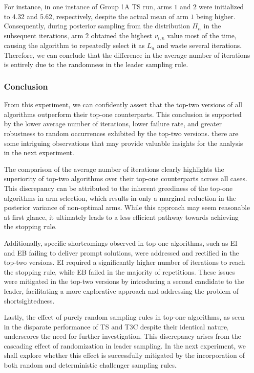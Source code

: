\documentclass[a4paper, 12pt]{article}
\theoremstyle{definition}
\begin{document}
For instance, in one instance of Group 1A TS run, arms $1$ and $2$ were initialized to 4.32 and 5.62, respectively, despite the actual mean of arm $1$ being higher. Consequently, during posterior sampling from the distribution $\Pi_n$ in the subsequent iterations, arm $2$ obtained the highest $v_{i,n}$ value most of the time, causing the algorithm to repeatedly select it as $L_n$ and waste several iterations. Therefore, we can conclude that the difference in the average number of iterations is entirely due to the randomness in the leader sampling rule.

\subsubsection{Conclusion}
From this experiment, we can confidently assert that the top-two versions of all algorithms outperform their top-one counterparts. This conclusion is supported by the lower average number of iterations, lower failure rate, and greater robustness to random occurrences exhibited by the top-two versions. there are some intriguing observations that may provide valuable insights for the analysis in the next experiment.

The comparison of the average number of iterations clearly highlights the superiority of top-two algorithms over their top-one counterparts across all cases. This discrepancy can be attributed to the inherent greediness of the top-one algorithms in arm selection, which results in only a marginal reduction in the posterior variance of non-optimal arms. While this approach may seem reasonable at first glance, it ultimately leads to a less efficient pathway towards achieving the stopping rule.

Additionally, specific shortcomings observed in top-one algorithms, such as EI and EB failing to deliver prompt solutions, were addressed and rectified in the top-two versions. EI required a significantly higher number of iterations to reach the stopping rule, while EB failed in the majority of repetitions. These issues were mitigated in the top-two versions by introducing a second candidate to the leader, facilitating a more explorative approach and addressing the problem of shortsightedness.

Lastly, the effect of purely random sampling rules in top-one algorithms, as seen in the disparate performance of TS and T3C despite their identical nature, underscores the need for further investigation. This discrepancy arises from the cascading effect of randomization in leader sampling. In the next experiment, we shall explore whether this effect is successfully mitigated by the incorporation of both random and deterministic challenger sampling rules.
\end{document}
